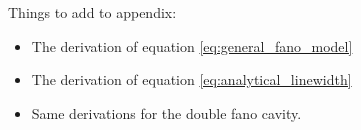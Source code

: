 \newpage
Things to add to appendix:
\begin{itemize}
    \item The derivation of equation \ref{eq:general_fano_model}
    \item The derivation of equation \ref{eq:analytical_linewidth}
    \item Same derivations for the double fano cavity.
\end{itemize}